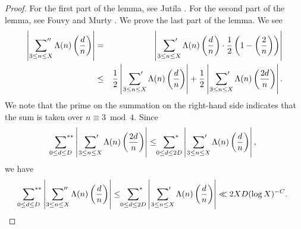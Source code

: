 \documentclass[10pt,a4paper]{amsart}
\theoremstyle{plain}
\begin{document}
\begin{proof}
    For the first part of the lemma, see Jutila \cite[Lemma 8]{Ju}.
    For the second part of the lemma, see Fouvy and Murty \cite[Lemma 6]{FM01}. We prove the last part of the lemma. We see 
\begin{eqnarray*}
    \left| \  \sideset{}{''} \sum_{3 \le n \le X} \Lambda(n) \left( \frac{d}{n}\right) \right|&=&\left|\, \sideset{}{'} \sum_{3 \le n \le X} \Lambda(n) \left( \frac{d}{n}\right) \cdot \frac{1}{2} \left(1 - \left( \frac{2}{n} \right) \right) \right|\\
    &\le& \frac{1}{2}\left|\, \sideset{}{'} \sum_{3 \le n \le X} \Lambda(n) \left( \frac{d}{n}\right) \right| +\frac{1}{2}\left|\, \sideset{}{'} \sum_{3 \le n \le X} \Lambda(n) \left( \frac{2d}{n}\right) \right|.
\end{eqnarray*}
We note that the prime on the summation on the right-hand side indicates that the sum is taken over $n \equiv 3\bmod4 $. 
Since 
\[
\sideset{}{^{**}} \sum_{0\le d \le D} \left|\, \sideset{}{'} \sum_{3 \le n \le X} \Lambda(n) \left( \frac{2d}{n}\right) \right| \le \sideset{}{^{*}} \sum_{0\le d \le 2D} \left|\, \sideset{}{'} \sum_{3 \le n \le X} \Lambda(n) \left( \frac{d}{n}\right) \right|,
\]
    we have
    \begin{eqnarray*}
       \sideset{}{^{**}} \sum_{0\le d \le D} \left| \  \sideset{}{''} \sum_{3 \le n \le X} \Lambda(n) \left( \frac{d}{n}\right) \right| \le \sideset{}{^{*}} \sum_{0\le d \le 2D} \left|\, \sideset{}{'} \sum_{3 \le n \le X} \Lambda(n) \left( \frac{d}{n}\right) \right|\ll  2XD(\log X)^{-C}.
    \end{eqnarray*}

    
\end{proof}

\end{document}
